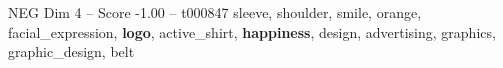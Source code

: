 \begin{textsample}{NEG Dim 4 – Score -1.00 – t000847}  \label{ex:f4_neg_003}
sleeve, shoulder, smile, orange, facial\_expression, \textbf{logo}, active\_shirt, \textbf{happiness}, design, advertising, graphics, graphic\_design, belt

\end{textsample}
